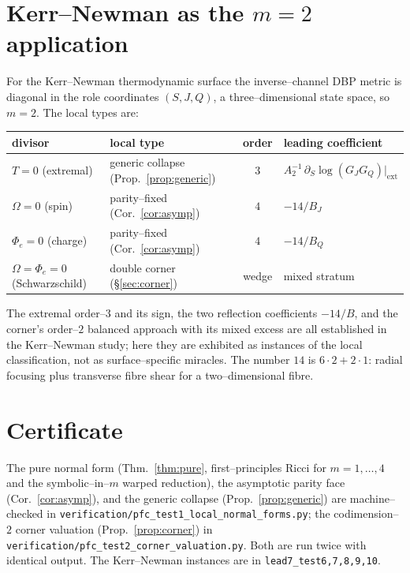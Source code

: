 \documentclass[11pt]{article}
\begin{document}
\section{Kerr--Newman as the $m=2$ application}

For the Kerr--Newman thermodynamic surface the inverse--channel DBP metric is diagonal in the
role coordinates $(S,J,Q)$, a three--dimensional state space, so $m=2$. The local types are:

\begin{center}
\begin{tabular}{llcl}
\hline
divisor & local type & order & leading coefficient\\
\hline
$T=0$ (extremal) & generic collapse (Prop.~\ref{prop:generic}) & $3$ &
  $A_2^{-1}\,\partial_S\log(G_JG_Q)|_{\mathrm{ext}}$\\
$\Omega=0$ (spin) & parity--fixed (Cor.~\ref{cor:asymp}) & $4$ & $-14/B_J$\\
$\Phi_e=0$ (charge) & parity--fixed (Cor.~\ref{cor:asymp}) & $4$ & $-14/B_Q$\\
$\Omega=\Phi_e=0$ (Schwarzschild) & double corner (\S\ref{sec:corner}) & wedge & mixed stratum\\
\hline
\end{tabular}
\end{center}

The extremal order--$3$ and its sign, the two reflection coefficients $-14/B$, and the
corner's order--$2$ balanced approach with its mixed excess are all established in the
Kerr--Newman study; here they are exhibited as instances of the local classification, not as
surface--specific miracles. The number $14$ is $6\cdot2+2\cdot1$: radial focusing plus
transverse fibre shear for a two--dimensional fibre.

\section*{Certificate}

The pure normal form (Thm.~\ref{thm:pure}, first--principles Ricci for $m=1,\dots,4$ and the
symbolic--in--$m$ warped reduction), the asymptotic parity face (Cor.~\ref{cor:asymp}), and the
generic collapse (Prop.~\ref{prop:generic}) are machine--checked in
\texttt{verification/pfc\_test1\_local\_normal\_forms.py}; the codimension--$2$ corner
valuation (Prop.~\ref{prop:corner}) in \texttt{verification/pfc\_test2\_corner\_valuation.py}.
Both are run twice with identical output. The Kerr--Newman instances are in
\texttt{lead7\_test6,7,8,9,10}.
\end{document}
